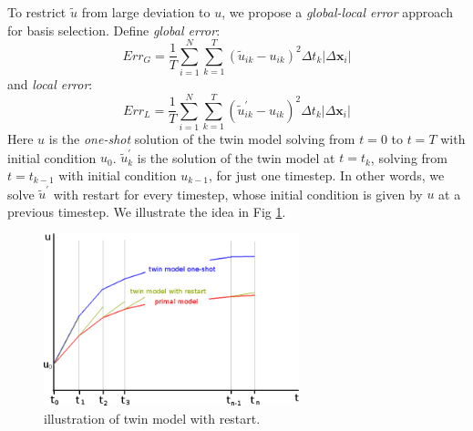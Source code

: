 \documentclass[a4paper,onecolumn]{article}
\theoremstyle{remark}
\begin{document}
\noindent To restrict $\tilde{u}$ from large deviation to $u$, we propose a \emph{global-local
error} approach for basis selection.
Define \emph{global error}:
\begin{equation}
    Err_{G} = 
    \frac{1}{T}\sum_{i=1}^{N}\sum_{k=1}^{T} \left(\tilde{u}_{ik} - u_{ik}\right)^2 \Delta t_k
    \left| \Delta \mathbf{x}_i \right|
    \label{global error}
\end{equation}
and \emph{local error}:
\begin{equation}
    Err_{L} = 
    \frac{1}{T}\sum_{i=1}^{N}\sum_{k=1}^{T} \left(\tilde{u}^\prime_{ik} - u_{ik}\right)^2 \Delta t_k
    \left| \Delta \mathbf{x}_i \right|
    \label{local error}
\end{equation}
Here $u$ is the \emph{one-shot} solution of the 
twin model solving from $t=0$ to $t=T$ with initial condition $u_0$.
$\tilde{u}^\prime_k$ is the solution of the twin model at $t=t_{k}$, solving from $t=t_{k-1}$
with initial condition $u_{k-1}$, for just one timestep. In other words, 
we solve $\tilde{u}^\prime$ with restart for every timestep, whose
initial condition is given by $u$ at a previous timestep.
We illustrate the idea in Fig \ref{fig:tmodelrestart}.
\begin{figure}[H]\begin{center}
    \includegraphics[height=5cm]{sketch2.png}
    \caption{illustration of twin model with restart.}
    \label{fig:tmodelrestart}
\end{center}
\end{figure}
\end{document}

